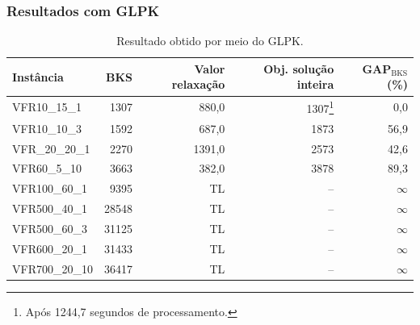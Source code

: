 \documentclass[professionalfonts]{beamer}
\begin{document}
\begin{frame}
   \frametitle{Resultados com GLPK}

   \begin{table}[H]
      \centering
      \scriptsize
      \begin{tabular}{lrrrr}
         \toprule
         Instância & BKS & Valor relaxação & Obj. solução inteira & GAP$_\mathrm{BKS}$ (\%) \\
         \midrule
         VFR10\_15\_1 & 1307 & 880,0 & 1307\footnote[frame]{Após 1244,7 segundos de
         processamento.} & \phantom{0}0,0\\
         VFR10\_10\_3 & 1592 & 687,0 & 1873 & 56,9\\
         VFR\_20\_20\_1 & 2270 & 1391,0 & 2573 & 42,6\\
         VFR60\_5\_10 & 3663 & 382,0 & 3878 & 89,3\\
         VFR100\_60\_1 & 9395  &  TL & -- & $\infty$\\
         VFR500\_40\_1 & 28548 &  TL & -- & $\infty$\\
         VFR500\_60\_3 & 31125 &  TL & -- & $\infty$\\
         VFR600\_20\_1 & 31433 &  TL & -- & $\infty$\\
         VFR700\_20\_10 & 36417 & TL & -- & $\infty$\\ 
         \bottomrule
      \end{tabular}
      \caption{Resultado obtido por meio do GLPK.}
      \label{table:results-glpk}
   \end{table}

\end{frame}
\end{document}
